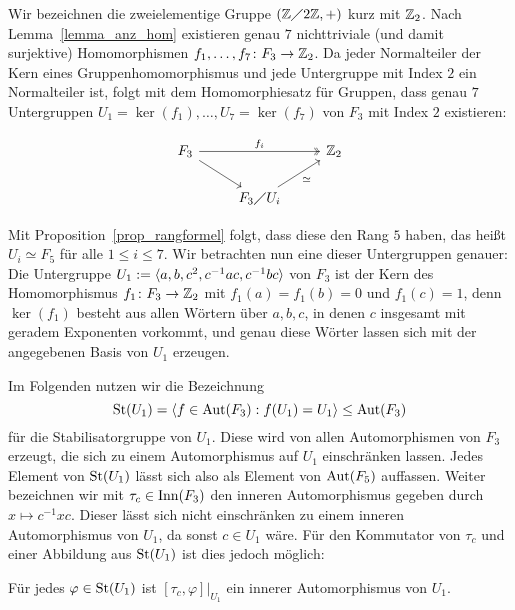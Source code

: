Wir bezeichnen die zweielementige Gruppe $(\mathbb{Z} \diagup 2\mathbb{Z},+)$ kurz mit $\mathbb{Z}_2$. Nach Lemma~\ref{lemma_anz_hom} existieren genau $7$ nichttriviale (und damit surjektive) Homomorphismen $f_1,\dots,f_7\colon F_3 \rightarrow \mathbb{Z}_2$. Da jeder Normalteiler der Kern eines Gruppenhomomorphismus und jede Untergruppe mit Index $2$ ein Normalteiler ist, folgt mit dem Homomorphiesatz für Gruppen, dass genau $7$ Untergruppen $U_1 = \ker(f_1), \dots, U_7 = \ker(f_7)$ von $F_3$ mit Index $2$ existieren:

\[
	\begin{tikzcd}
		F_3	\arrow[two heads]{rr}{f_i} \arrow{rd} & & \ZZ_2 \\
		& F_3 \diagup U_i \arrow{ur}[swap]{\simeq}
	\end{tikzcd}
\]

Mit Proposition~\ref{prop_rangformel} folgt, dass diese den Rang $5$ haben, das heißt $U_i \simeq F_5$ für alle $1 \leq i \leq 7$. Wir betrachten nun eine dieser Untergruppen genauer: Die Untergruppe $U_1 := \langle a,b,c^2,c^{-1}ac,c^{-1}bc\rangle$ von $F_3$ ist der Kern des Homomorphismus $f_1 \colon F_3 \rightarrow \mathbb{Z}_2$ mit $f_1(a)=f_1(b)=0$ und $f_1(c)=1$, denn $\ker(f_1)$ besteht aus allen Wörtern über $a,b,c$, in denen $c$ insgesamt mit geradem Exponenten vorkommt, und genau diese Wörter lassen sich mit der angegebenen Basis von $U_1$ erzeugen.

Im Folgenden nutzen wir die Bezeichnung
\[
\operatorname{St}(U_1) = \langle f \in \operatorname{Aut}(F_3) : f(U_1) = U_1\rangle \leq \operatorname{Aut}(F_3)
\]
für die Stabilisatorgruppe von $U_1$. Diese wird von allen Automorphismen von $F_3$ erzeugt, die sich zu einem Automorphismus auf $U_1$ einschränken lassen. Jedes Element von $\operatorname{St}(U_1)$ lässt sich also als Element von $\operatorname{Aut}(F_5)$ auffassen. Weiter bezeichnen wir mit $\tau_c \in \operatorname{Inn}(F_3)$ den inneren Automorphismus gegeben durch $x \mapsto c^{-1}xc$. Dieser lässt sich nicht einschränken zu einem inneren Automorphismus von $U_1$, da sonst $c \in U_1$ wäre. Für den Kommutator von $\tau_c$ und einer Abbildung aus $\operatorname{St}(U_1)$ ist dies jedoch möglich:

\begin{proposition}
\label{claim}
	Für jedes $\varphi \in \operatorname{St}(U_1)$ ist $[\tau_c,\varphi] \big|_{U_1}$ ein innerer Automorphismus von $U_1$.
\end{proposition}

